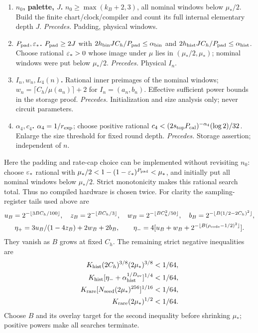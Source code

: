 \begin{enumerate}[label=\arabic*.,leftmargin=2em]
\item \textbf{\boldmath\(n_0\), palette, \(J\).} \(n_0\ge\max(k_B+2,3)\), all nominal windows
below \(\mu_*/2\). Build the finite chart/clock/compiler and count
its full internal elementary depth \(J\).
\emph{Precedes.} Padding, physical windows.

\item \textbf{\boldmath\(P_{\rm pad},\varepsilon_*\).} \(P_{\rm pad}\ge2J\) with
\(2h_{\rm bin}JC_h/P_{\rm pad}\le\alpha_{\rm bin}\) and
\(2h_{\rm hist}JC_h/P_{\rm pad}\le\alpha_{\rm hist}\).
Choose rational \(\varepsilon_*>0\) whose image under \(\mu\) lies in
\((\mu_*/2,\mu_*)\); nominal windows were put below \(\mu_*/2\).
\emph{Precedes.} Physical \(I_n\).

\item \textbf{\boldmath\(I_n,w_n,L_4(n)\).} Rational inner preimages of the nominal windows;
\(w_n=\lceil C_h/\mu(a_n)\rceil+2\) for \(I_n=(a_n,b_n)\).
Effective sufficient power bounds in the storage proof.
\emph{Precedes.} Initialization
and size analysis only; never circuit parameters.

\item \textbf{\boldmath\(\alpha_4,c_4\).} \(\alpha_4=1/r_{\rm exp}\);
choose positive rational \(c_4<(2s_{\rm top}P_{\rm cal})^{-\alpha_4}(\log2)/32\).
Enlarge the size threshold for fixed round depth.
\emph{Precedes.} Storage assertion;
independent of \(n\).
\end{enumerate}

Here the padding and rate-cap choice can be implemented without revisiting \(n_0\):
choose \(\varepsilon_*\) rational with
\(\mu_*/2<1-(1-\varepsilon_*)^{P_{\rm pad}}<\mu_*\), and initially put all
nominal windows below \(\mu_*/2\). Strict monotonicity makes this
rational search total. Thus no compiled hardware is chosen twice.
For clarity the sampling-register tails used above are
\[
\begin{gathered}
 u_B=2^{-\lfloor3BC_h/100\rfloor},\quad
 z_B=2^{-\lfloor BC_h/3\rfloor},\quad
 w_B=2^{-\lfloor BC_h^2/50\rfloor},\quad
 b_B=2^{-\lfloor B(1/2-2C_h)^2\rfloor},\\
 \eta_+=3u_B/(1-4z_B)+2w_B+2b_B,\qquad
 \eta_-=4[u_B+w_B+2^{-\lfloor B(\rho_{\rm code}-1/2)^2\rfloor}].
\end{gathered}
\]
They vanish as \(B\) grows at fixed \(C_h\). The remaining strict
negative inequalities are
\begin{align*}
 K_{\rm hist}(2C_h)^{3/8}(2\mu_*)^{3/8}&<1/64,\\
 K_{\rm hist}[\eta_-+\alpha_{\rm hist}^{1/D_{\rm ov}}]^{1/4}&<1/64,\\
 K_{\rm rare}[N_{\rm seed}(2\mu_*)^{256}]^{1/16}&<1/64,\\
 K_{\rm rare}(2\mu_*)^{1/2}&<1/64.
\end{align*}
Choose \(B\) and its overlay target for the second inequality before
shrinking \(\mu_*\); positive powers make all searches terminate.

